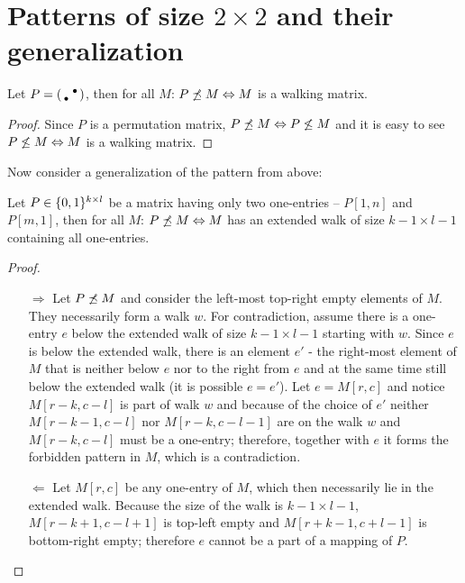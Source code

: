\section{Patterns of size $2\times2$ and their generalization}
\label{sec2by2}

\begin{thm}
\label{walkingthm}
Let $P=\left(\begin{smallmatrix} &\bullet\\\bullet& \end{smallmatrix}\right)$, then for all $M$: $P\not\preceq M\Leftrightarrow M$ is a walking matrix.
\end{thm}
\begin{proof}
Since $P$ is a permutation matrix, $P\not\preceq M\Leftrightarrow P\not\leq M$ and it is easy to see $P\not\leq M\Leftrightarrow M$ is a walking matrix.
\end{proof}

Now consider a generalization of the pattern from above:
\begin{thm}
Let $P\in\{0,1\}^{k\times l}$ be a matrix having only two one-entries -- $P[1,n]$ and $P[m,1]$, then for all $M$: $P\not\preceq M\Leftrightarrow M$ has an extended walk of size $k-1\times l-1$ containing all one-entries.
\end{thm}
\begin{proof}
\begin{itemize}
\item[$\Rightarrow$] Let $P\not\preceq M$ and consider the left-most top-right empty elements of $M$. They necessarily form a walk $w$. For contradiction, assume there is a one-entry $e$ below the extended walk of size $k-1\times l-1$ starting with $w$. Since $e$ is below the extended walk, there is an element $e'$ - the right-most element of $M$ that is neither below $e$ nor to the right from $e$ and at the same time still below the extended walk (it is possible $e=e'$). Let $e=M[r,c]$ and notice $M[r-k,c-l]$ is part of walk $w$ and because of the choice of $e'$ neither $M[r-k-1,c-l]$ nor $M[r-k,c-l-1]$ are on the walk $w$ and $M[r-k,c-l]$ must be a one-entry; therefore, together with $e$ it forms the forbidden pattern in $M$, which is a contradiction.
\item[$\Leftarrow$] Let $M[r,c]$ be any one-entry of $M$, which then necessarily lie in the extended walk. Because the size of the walk is $k-1\times l-1$, $M[r-k+1,c-l+1]$ is top-left empty and $M[r+k-1,c+l-1]$ is bottom-right empty; therefore $e$ cannot be a part of a mapping of $P$. 
\end{itemize}
\end{proof}

